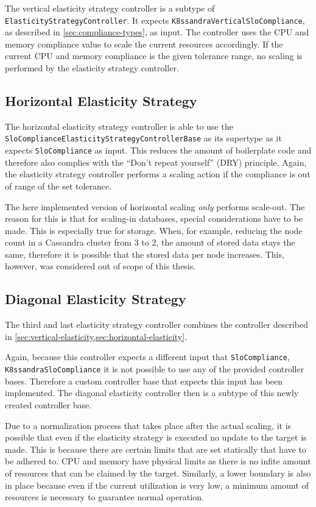 The vertical elasticity strategy controller is a subtype of \texttt{Elasticity\-Strategy\-Controller}. It expects \texttt{K8ssandra\-Vertical\-Slo\-Compliance}, as described in \cref{sec:compliance-types}, as input. The controller uses the CPU and memory compliance value to scale the current resources accordingly. If the current CPU and memory compliance is the given tolerance range, no scaling is performed by the elasticity strategy controller.

\subsection{Horizontal Elasticity Strategy}
\label{sec:horizontal-elasticity}

The horizontal elasticity strategy controller is able to use the \texttt{Slo\-Compliance\-E\-las\-tic\-i\-ty\-Strategy\-Controller\-Base} as its supertype as it expects \texttt{Slo\-Compliance} as input. This reduces the amount of boilerplate code and therefore also complies with the ``Don't repeat yourself'' (DRY) principle. Again, the elasticity strategy controller performs a scaling action if the compliance is out of range of the set tolerance.

The here implemented version of horizontal scaling \textit{only} performs scale-out. The reason for this is that for scaling-in databases, special considerations have to be made. This is especially true for storage. When, for example, reducing the node count in a Cassandra cluster from 3 to 2, the amount of stored data stays the same, therefore it is possible that the stored data per node increases. This, however, was considered out of scope of this thesis.

\subsection{Diagonal Elasticity Strategy}
\label{sec:diagonal-elasticity}


The third and last elasticity strategy controller combines the controller described in \cref{sec:vertical-elasticity,sec:horizontal-elasticity}.

Again, because this controller expects a different input that \texttt{SloCompliance}, \texttt{K8\-ssan\-dra\-Slo\-Compliance} it is not possible to use any of the provided controller bases. Therefore a custom controller base that expects this input has been implemented. The diagonal elasticity controller then is a subtype of this newly created controller base.

Due to a normalization process that takes place after the actual scaling, it is possible that even if the elasticity strategy is executed no update to the target is made. This is because there are certain limits that are set statically that have to be adhered to. CPU and memory have physical limits as there is no infite amount of resources that can be claimed by the target. Similarly, a lower boundary is also in place because even if the current utilization is very low, a minimum amount of resources is necessary to guarantee normal operation.
